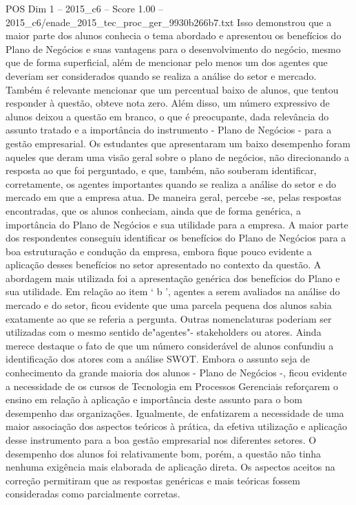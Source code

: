 \begin{textsample}{POS Dim 1 – 2015\_c6 – Score 1.00 – 2015\_c6/enade\_2015\_tec\_proc\_ger\_9930b266b7.txt}
Isso demonstrou que a maior parte dos alunos conhecia o tema abordado e apresentou os benefícios do Plano de Negócios e suas vantagens para o desenvolvimento do negócio, mesmo que de forma superficial, além de mencionar pelo menos um dos agentes que deveriam ser considerados quando se realiza a análise do setor e mercado.
Também é relevante mencionar que um percentual baixo de alunos, que tentou responder à questão, obteve nota zero.
Além disso, um número expressivo de alunos deixou a questão em branco, o que é preocupante, dada relevância do assunto tratado e a importância do instrumento - Plano de Negócios - para a gestão empresarial.
Os estudantes que apresentaram um baixo desempenho foram aqueles que deram uma visão geral sobre o plano de negócios, não direcionando a resposta ao que foi perguntado, e que, também, não souberam identificar, corretamente, os agentes importantes quando se realiza a análise do setor e do mercado em que a empresa atua.
De maneira geral, percebe -se, pelas respostas encontradas, que os alunos conheciam, ainda que de forma genérica, a importância do Plano de Negócios e sua utilidade para a empresa.
A maior parte dos respondentes conseguiu identificar os benefícios do Plano de Negócios para a boa estruturação e condução da empresa, embora fique pouco evidente a aplicação desses benefícios no setor apresentado no contexto da questão.
A abordagem mais utilizada foi a apresentação genérica dos benefícios do Plano e sua utilidade.
Em relação ao item ‘ b ’, agentes a serem avaliados na análise do mercado e do setor, ficou evidente que uma parcela pequena dos alunos sabia exatamente ao que se referia a pergunta.
Outras nomenclaturas poderiam ser utilizadas com o mesmo sentido de"agentes"- stakeholders ou atores.
Ainda merece destaque o fato de que um número considerável de alunos confundiu a identificação dos atores com a análise SWOT.
Embora o assunto seja de conhecimento da grande maioria dos alunos - Plano de Negócios -, ficou evidente a necessidade de os cursos de Tecnologia em Processos Gerenciais reforçarem o ensino em relação à aplicação e importância deste assunto para o bom desempenho das organizações.
Igualmente, de enfatizarem a necessidade de uma maior associação dos aspectos teóricos à prática, da efetiva utilização e aplicação desse instrumento para a boa gestão empresarial nos diferentes setores.
O desempenho dos alunos foi relativamente bom, porém, a questão não tinha nenhuma exigência mais elaborada de aplicação direta.
Os aspectos aceitos na correção permitiram que as respostas genéricas e mais teóricas fossem consideradas como parcialmente corretas.

\end{textsample}
